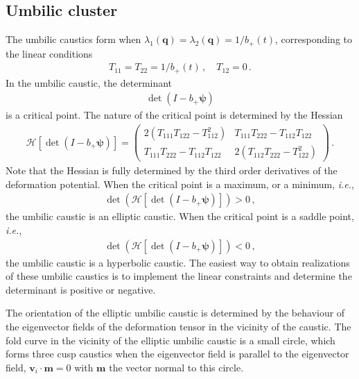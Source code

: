 \documentclass[a4paper, 11pt]{article}
\begin{document}
\subsection{Umbilic cluster}
The umbilic caustics form when $\lambda_1(\bm{q}) = \lambda_2(\bm{q}) = 1/b_+(t)$, corresponding to the linear conditions
\begin{align}
T_{11}=T_{22}=1/b_+(t)\,, \quad T_{12}=0\,.
\end{align}
In the umbilic caustic, the determinant 
\begin{align}
\det (I- b_+ \bm{\psi})
\end{align}
is a critical point. The nature of the critical point is determined by the Hessian
\begin{align}
\mathcal{H}\left[\det (I- b_+ \bm{\psi})\right] =
\begin{pmatrix} 
2(T_{111}T_{122} -T_{112}^2) & T_{111}T_{222}-T_{112}T_{122} \\
T_{111}T_{222}-T_{112}T_{122} & 2(T_{112}T_{222}-T_{122}^2)
\end{pmatrix}\,.
\end{align}
Note that the Hessian is fully determined by the third order derivatives of the deformation potential. When the critical point is a maximum, or a minimum, \textit{i.e.},
\begin{align}
\det (\mathcal{H}\left[\det (I- b_+ \bm{\psi})\right]) >0\,,
\end{align}
the umbilic caustic is an elliptic caustic. When the critical point is a saddle point, \textit{i.e.},
\begin{align}
\det (\mathcal{H}\left[\det (I- b_+ \bm{\psi})\right]) <0\,,
\end{align}
the umbilic caustic is a hyperbolic caustic. The easiest way to obtain realizations of these umbilic caustics is to implement the linear constraints and determine the determinant is positive or negative.

The orientation of the elliptic umbilic caustic is determined by the behaviour of the eigenvector fields of the deformation tensor in the vicinity of the caustic. The fold curve in the vicinity of the elliptic umbilic caustic is a small circle, which forms three cusp caustics when the eigenvector field is parallel to the eigenvector field, $\bm{v}_i \cdot \bm{m} = 0$ with $\bm{m}$ the vector normal to this circle.
\end{document}
